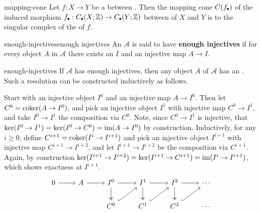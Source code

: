 \begin{example}{mapping-cone}
    Let $f : X \to Y$ be a  between . Then the mapping cone $C(f_\bdot)$ of the induced morphism $f_\bdot : C_\bdot(X; \ZZ) \to C_\bdot(Y; \ZZ)$ between  of $X$ and $Y$ is  to the singular complex of the  of $f$.
\end{example}

\begin{topic}{enough-injectives}{enough injectives}
    An  $\mathcal{A}$ is said to have \textbf{enough injectives} if for every object $A$ in $\mathcal{A}$ there exists an  $I$ and an injective map $A \to I$.
\end{topic}

\begin{example}{enough-injectives}
    If $\mathcal{A}$ has enough injectives, then any object $A$ of $\mathcal{A}$ has an . Such a resolution can be constructed inductively as follows.
    
    Start with an injective object $I^0$ and an injective map $A \to I^0$. Then let $C^0 = \operatorname{coker} (A \to I^0)$, and pick an injective object $I^1$ with injective map $C^0 \to I^1$, and take $I^0 \to I^1$ the composition via $C^0$. Note, since $C^0 \to I^1$ is injective, that $\ker (I^0 \to I^1) = \ker(I^0 \to C^0) = \operatorname{im} (A \to I^0)$ by construction. Inductively, for any $i \ge 0$, define $C^{i + 1} = \operatorname{coker}(I^i \to I^{i + 1})$ and pick an injective object $I^{i + 1}$ with injective map $C^{i + 1} \to I^{i + 2}$, and let $I^{i + 1} \to I^{i + 2}$ be the composition via $C^{i + 1}$. Again, by construction $\ker (I^{i + 1} \to I^{i + 2}) = \ker (I^{i + 1} \to C^{i + 1}) = \operatorname{im} (I^i \to I^{i + 1})$, which shows exactness at $I^{i + 1}$.
    \[ \begin{tikzcd}
        0 \arrow{r} & A \arrow{r} & I^0 \arrow[twoheadrightarrow]{d} \arrow{r} & I^1 \arrow[twoheadrightarrow]{d} \arrow{r} & I^2 \arrow[twoheadrightarrow]{d} \arrow{r} & \cdots \\
        & & C^0 \arrow[hookrightarrow]{ur} & C^1 \arrow[hookrightarrow]{ur} & C^2 \arrow[hookrightarrow]{ur} & \cdots
    \end{tikzcd} \]
\end{example}

